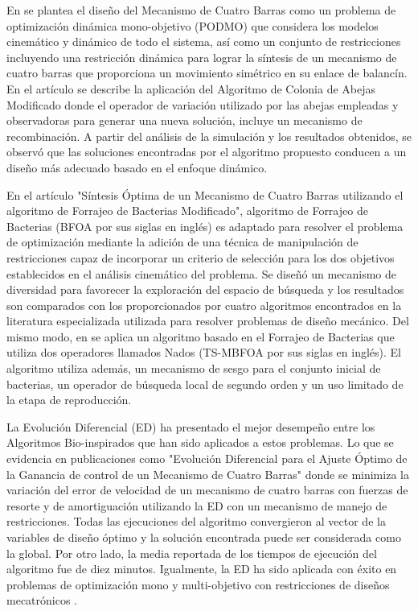  En \cite{portilla-flores_dynamic_nodate} se plantea el diseño del Mecanismo de Cuatro Barras como un problema de optimización dinámica mono-objetivo (PODMO) que considera los modelos cinemático y dinámico de todo el sistema, así como un conjunto de restricciones incluyendo una restricción dinámica para lograr la síntesis de un mecanismo de cuatro barras que proporciona un movimiento simétrico en su enlace de balancín. En el artículo se describe la aplicación del Algoritmo de Colonia de Abejas Modificado donde el operador de variación utilizado por las abejas empleadas y observadoras para generar una nueva solución, incluye un mecanismo de recombinación. A partir del análisis de la simulación y los resultados obtenidos, se observó que las soluciones encontradas por el algoritmo propuesto conducen a un diseño más adecuado basado en el enfoque dinámico.


En el artículo "Síntesis Óptima de un Mecanismo de Cuatro Barras utilizando el algoritmo de Forrajeo de Bacterias Modificado", algoritmo de Forrajeo de Bacterias (BFOA por sus siglas en inglés) es adaptado para resolver el problema de optimización mediante la adición de una técnica de manipulación de restricciones capaz de incorporar un criterio de selección para los dos objetivos establecidos en el análisis cinemático del problema. Se diseñó un mecanismo de diversidad para favorecer la exploración del espacio de búsqueda y los resultados son comparados con los proporcionados por cuatro algoritmos encontrados en la literatura especializada utilizada para resolver problemas de diseño mecánico\cite{mezura-montes_optimum_2014}. Del mismo modo, en \cite{herne1_two_swim_2016} se aplica un algoritmo basado en el Forrajeo de Bacterias que utiliza dos operadores llamados Nados (TS-MBFOA por sus siglas en inglés). El algoritmo utiliza además, un mecanismo de sesgo para el conjunto inicial de bacterias, un operador de búsqueda local de segundo orden y un uso limitado de la etapa de reproducción.
  
La Evolución Diferencial (ED) ha presentado el mejor desempeño entre los Algoritmos Bio-inspirados que han sido aplicados a estos problemas. Lo que se evidencia en publicaciones como "Evolución Diferencial para el Ajuste Óptimo de la Ganancia de control de un Mecanismo de Cuatro Barras" donde se minimiza la variación del error de velocidad de un mecanismo de cuatro barras con fuerzas de resorte y de amortiguación utilizando la ED con un mecanismo de manejo de restricciones. Todas las ejecuciones del algoritmo convergieron al vector de la variables de diseño óptimo y la solución encontrada puede ser considerada como la global. Por otro lado, la media reportada de los tiempos de ejecución  del algoritmo fue de diez minutos. Igualmente, la ED ha sido aplicada con éxito en problemas de optimización mono y multi-objetivo con restricciones de diseños mecatrónicos \cite{portilla-flores_integration_2007} \cite{villarreal-cervantes_control_2013}.
  
